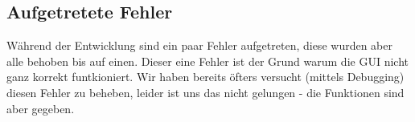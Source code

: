 \subsection{Aufgetretete Fehler}
Während der Entwicklung sind ein paar Fehler aufgetreten, diese wurden aber alle behoben bis auf einen. Dieser eine
Fehler ist der Grund warum die GUI nicht ganz korrekt funtkioniert. Wir haben bereits öfters versucht (mittels Debugging)
diesen Fehler zu beheben, leider ist uns das nicht gelungen - die Funktionen sind aber gegeben.